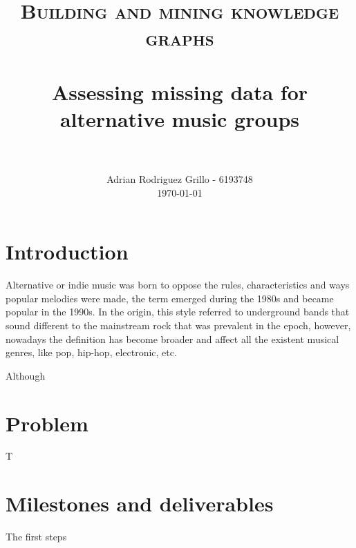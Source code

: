 \documentclass[paper=a4,fontsize=11pt]{scrartcl}
\title{
		\usefont{OT1}{bch}{b}{n}
		\normalfont \normalsize \textsc{Building and mining knowledge graphs} \\ [25pt]
		\horrule{0.5pt} \\[0.4cm]
		\huge Assessing missing data for alternative music groups \\
		\horrule{2pt} \\[0.5cm]
}
\author{
		\normalfont 								\normalsize
        Adrian Rodriguez Grillo - 6193748\\[-3pt]		\normalsize
        \today
}
\date{}
\numberwithin{equation}{section}		%
\numberwithin{figure}{section}			%
\numberwithin{table}{section}				%
\begin{document}
\maketitle
\section{Introduction}

Alternative or indie music was born to oppose the rules, characteristics and ways popular melodies were made, the term emerged during the 1980s and became popular in the 1990s. 
In the origin, this style referred to underground bands that sound different to the mainstream rock that was prevalent in the epoch, however, nowadays the definition has become broader and affect all the existent musical genres, like pop, hip-hop, electronic, etc.

Although 


\section{Problem}
T

\section{Milestones and deliverables}
The first steps 


{\tiny\printbibliography}
\end{document}
